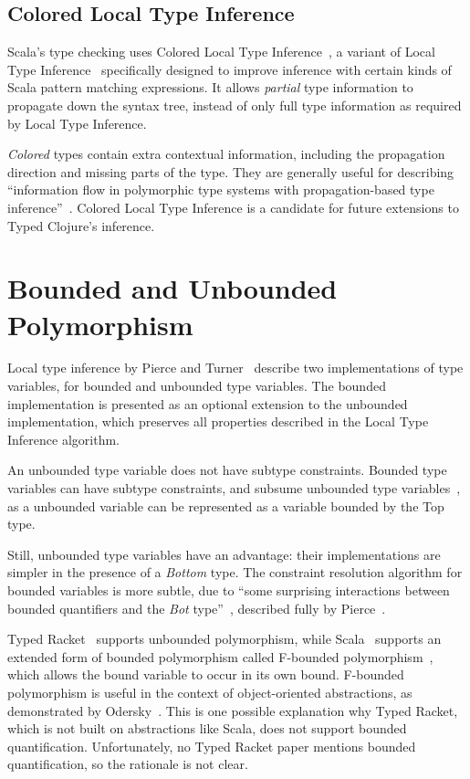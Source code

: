 \subsection{Colored Local Type Inference}

Scala's type checking uses Colored Local Type Inference~\cite{OZZ01},
a variant of Local Type Inference~\cite{PT00} specifically designed to
improve inference with certain kinds of Scala pattern matching expressions. It allows
 \emph{partial} type information to propagate down the syntax tree, instead of only full type information
as required by Local Type Inference.

\emph{Colored} types contain extra contextual information, including the propagation direction
and missing parts of the type. They are generally useful
for describing ``information flow in polymorphic type systems with propagation-based type inference''~\cite{OZZ01}. 
Colored Local Type Inference is a candidate for future extensions 
to Typed Clojure's inference.

\section{Bounded and Unbounded Polymorphism}

Local type inference by Pierce and Turner~\cite{PT00}
describe two implementations of type variables, for bounded
and unbounded type variables. The bounded implementation is presented
as an optional extension  to the unbounded implementation, which preserves all
properties described in the Local Type Inference algorithm.

An unbounded type variable does not have subtype constraints.
Bounded type variables can have subtype constraints, and 
subsume unbounded type variables~\cite{PT00}, 
as a unbounded variable can be represented as a variable bounded
by the Top type.

Still, unbounded type variables have an advantage: their implementations are
simpler in the presence of a \emph{Bottom} type. 
The constraint resolution algorithm for bounded variables
is more subtle, due to ``some surprising interactions between bounded quantifiers
and the \emph{Bot} type''~\cite{PT00}, described fully
by Pierce~\cite{Pie97}.

Typed Racket~\cite{TF08}
supports unbounded polymorphism, while Scala~\cite{OCD+}
supports an extended form of bounded polymorphism called
F-bounded polymorphism~\cite{CCHOM89}, which allows the
bound variable to occur in its own bound.
F-bounded polymorphism is useful in the context of object-oriented abstractions,
as demonstrated by Odersky~\cite{OCD+}.
This is one possible explanation why Typed Racket, which is not built on abstractions like Scala,
does not support bounded quantification. Unfortunately, no Typed Racket paper mentions 
bounded quantification, so the rationale is not clear.

